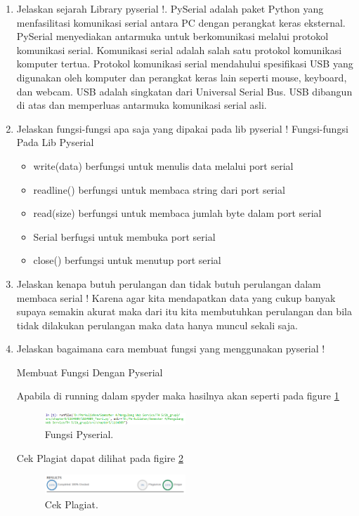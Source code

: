 \begin{enumerate}
\item Jelaskan sejarah Library pyserial !.
	\subitem PySerial adalah paket Python yang menfasilitasi komunikasi serial antara PC dengan perangkat keras eksternal. PySerial menyediakan antarmuka untuk berkomunikasi melalui protokol komunikasi serial. Komunikasi serial adalah salah satu protokol komunikasi komputer tertua. Protokol komunikasi serial mendahului spesiﬁkasi USB yang digunakan oleh komputer dan perangkat keras lain seperti mouse, keyboard, dan webcam. USB adalah singkatan dari Universal Serial Bus. USB dibangun di atas dan memperluas antarmuka komunikasi serial asli.

\item Jelaskan fungsi-fungsi apa saja yang dipakai pada lib pyserial !
	\subitem Fungsi-fungsi Pada Lib Pyserial
	\begin{itemize}
		\item write(data) berfungsi untuk menulis data melalui port serial
		\item readline() berfungsi untuk membaca string dari port serial
		\item read(size) berfungsi untuk membaca jumlah byte dalam port serial
		\item Serial berfugsi untuk membuka port serial
		\item close() berfungsi untuk menutup port serial
	\end{itemize}

\item Jelaskan kenapa butuh perulangan dan tidak butuh perulangan dalam membaca serial !
	\subitem Karena agar kita mendapatkan data yang cukup banyak supaya semakin akurat maka dari itu kita membutuhkan perulangan dan bila tidak dilakukan perulangan maka data hanya muncul sekali saja.

\item Jelaskan bagaimana cara membuat fungsi yang menggunakan pyserial !

	\subitem Membuat Fungsi Dengan Pyserial

	

	Apabila di running dalam spyder maka hasilnya akan seperti pada figure \ref{YNC5-8}

	\begin{figure}[!htbp]
		\centerline{\includegraphics[width=0.5\textwidth]{figures/chapter5/1164089/YNC5-8.png}}
		\caption{Fungsi Pyserial.}
		\label{YNC5-8}
	\end{figure}	

Cek Plagiat dapat dilihat pada figire \ref{YNC5-CekPlagiat}

	\begin{figure}[!htbp]
		\centerline{\includegraphics[width=0.5\textwidth]{figures/chapter5/1164089/YNC5-CekPlagiat.png}}
		\caption{Cek Plagiat.}
		\label{YNC5-CekPlagiat}
	\end{figure}		

\end{enumerate}
